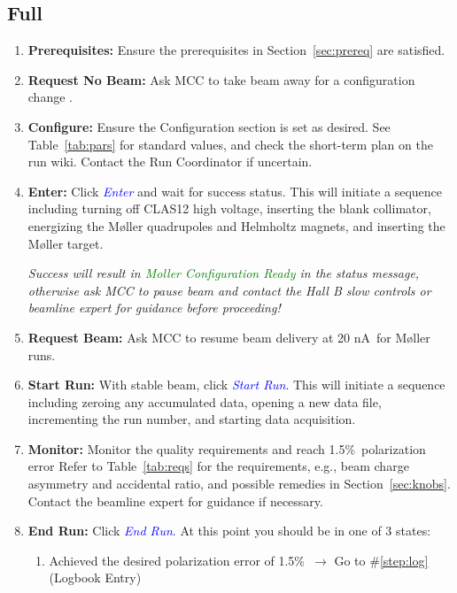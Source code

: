 \documentclass[amsmath,amssymb,notitlepage,12pt]{revtex4}
\newcommand{\ibeam}{20 nA\ }
\newcommand{\easy}{1.5\%}
\begin{document}
\subsection{Full}\label{sec:proc}

\begin{enumerate}\singlespacing
    \item {\bf Prerequisites:}  Ensure the prerequisites in Section~\ref{sec:prereq} are satisfied.
    \item {\bf Request No Beam:}  Ask MCC to take beam away for a configuration change \label{step:config}.
    \item {\bf Configure:}  Ensure the Configuration section is set as desired.
        See Table~\ref{tab:pars} for standard values, and check the short-term plan on the run wiki.  Contact the Run Coordinator if uncertain.
    \item {\bf Enter:} Click \textcolor{blue}{\em Enter} and wait for success status.
        This will initiate a sequence including turning off CLAS12 high voltage, inserting the blank collimator, energizing the M{\o}ller quadrupoles and Helmholtz magnets, and inserting the M{\o}ller target.
        \begin{adjustwidth}{1cm}{1cm}
            {\em Success will result in \textcolor{green}{\em Moller Configuration Ready} in the status message, otherwise ask MCC to pause beam and contact the Hall B slow controls or beamline expert for guidance before proceeding!}
        \end{adjustwidth}
    \item {\bf Request Beam:} Ask MCC to resume beam delivery at \ibeam for M{\o}ller runs.
    \item {\bf Start Run:} With stable beam, click \textcolor{blue}{\em Start Run}\label{step:start}.
        This will initiate a sequence including zeroing any accumulated data, opening a new data file, incrementing the run number, and starting data acquisition.
    \item {\bf Monitor:} Monitor the quality requirements and reach \easy\ polarization error
        Refer to Table~\ref{tab:reqs} for the requirements, e.g., beam charge asymmetry and accidental ratio, and possible remedies in Section~\ref{sec:knobs}.
        Contact the beamline expert for guidance if necessary.  
    \item {\bf End Run:} Click \textcolor{blue}{\em End Run}.  At this point you should be in one of 3 states:
        \begin{enumerate}
            \item Achieved the desired polarization error of \easy\ $\to$ Go to \#\ref{step:log} (Logbook Entry)

\end{enumerate}
\end{enumerate}
\end{document}
